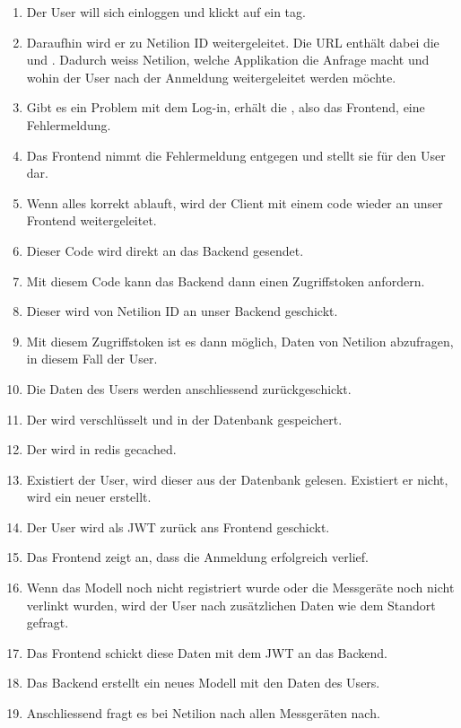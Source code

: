 \begin{enumerate}
  \item Der User will sich einloggen und klickt auf ein  tag.
  \item Daraufhin wird er zu Netilion ID weitergeleitet. Die URL enthält dabei die  und \newline{}. Dadurch weiss Netilion, welche Applikation die Anfrage macht und wohin der User nach der Anmeldung weitergeleitet werden möchte.
  \item Gibt es ein Problem mit dem Log-in, erhält die , also das Frontend, eine Fehlermeldung.
  \item Das Frontend nimmt die Fehlermeldung entgegen und stellt sie für den User dar.
  \item Wenn alles korrekt ablauft, wird der Client mit einem code wieder an unser Frontend weitergeleitet.
  \item Dieser Code wird direkt an das Backend gesendet.
  \item Mit diesem Code kann das Backend dann einen Zugriffstoken anfordern.
  \item Dieser wird von Netilion ID an unser Backend geschickt.
  \item Mit diesem Zugriffstoken ist es dann möglich, Daten von Netilion abzufragen, in diesem Fall der User.
  \item Die Daten des Users werden anschliessend zurückgeschickt.
  \item Der  wird verschlüsselt und in der Datenbank gespeichert.
  \item Der  wird in redis gecached.
  \item Existiert der User, wird dieser aus der Datenbank gelesen. Existiert er nicht, wird ein neuer erstellt.
  \item Der User wird als JWT zurück ans Frontend geschickt.
  \item Das Frontend zeigt an, dass die Anmeldung erfolgreich verlief.
  \item Wenn das Modell noch nicht registriert wurde oder die Messgeräte noch nicht verlinkt wurden, wird der User nach zusätzlichen Daten wie dem Standort gefragt.
  \item Das Frontend schickt diese Daten mit dem JWT an das Backend.
  \item Das Backend erstellt ein neues Modell mit den Daten des Users.
  \item Anschliessend fragt es bei Netilion nach allen Messgeräten nach.

\end{enumerate}
